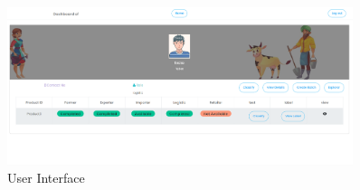 \begin{figure}[htbp]
  \centering
  \includegraphics[width=0.9\textwidth]{Chapters/Chapter_7/images/User_interface.png}
  \caption{User Interface }
  \label{fig:figure7_1}
  \end{figure}
